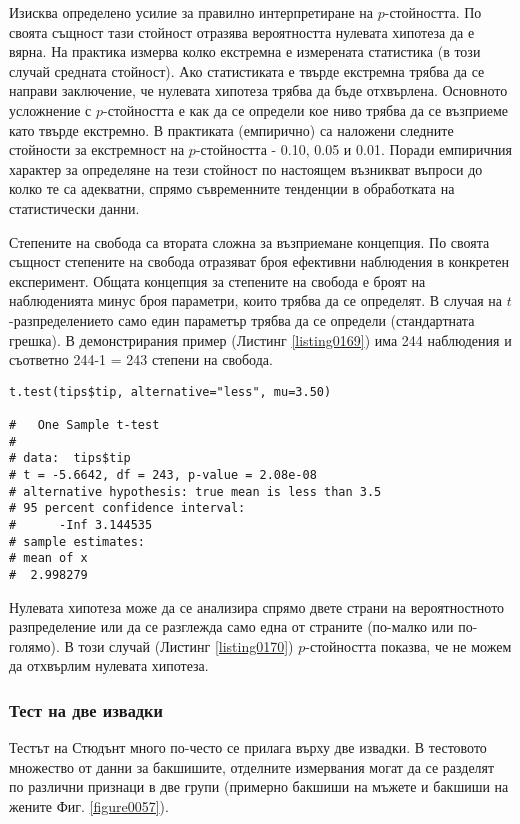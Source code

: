 Изисква определено усилие за правилно интерпретиране на $p$-стойността. По своята същност тази стойност отразява вероятността нулевата хипотеза да е вярна. На практика измерва колко екстремна е измерената статистика (в този случай средната стойност). Ако статистиката е твърде екстремна трябва да се направи заключение, че нулевата хипотеза трябва да бъде отхвърлена. Основното усложнение с $p$-стойността е как да се определи кое ниво трябва да се възприеме като твърде екстремно. В практиката (емпирично) са наложени следните стойности за екстремност на $p$-стойността - 0.10, 0.05 и 0.01. Поради емпиричния характер за определяне на тези стойност по настоящем възникват въпроси до колко те са адекватни, спрямо съвременните тенденции в обработката на статистически данни. 

Степените на свобода са втората сложна за възприемане концепция. По своята същност степените на свобода отразяват броя ефективни наблюдения в конкретен експеримент. Общата концепция за степените на свобода е броят на наблюденията минус броя параметри, които трябва да се определят. В случая на $t$-разпределението само един параметър трябва да се определи (стандартната грешка). В демонстрирания пример (Листинг \ref{listing0169}) има 244 наблюдения и съответно 244-1 = 243 степени на свобода. 

\begin{lstlisting}[caption=Едностранна t-статистика, label=listing0170]
t.test(tips$tip, alternative="less", mu=3.50)

# 	One Sample t-test
# 
# data:  tips$tip
# t = -5.6642, df = 243, p-value = 2.08e-08
# alternative hypothesis: true mean is less than 3.5
# 95 percent confidence interval:
#      -Inf 3.144535
# sample estimates:
# mean of x 
#  2.998279 
\end{lstlisting}

Нулевата хипотеза може да се анализира спрямо двете страни на вероятностното разпределение или да се разглежда само една от страните (по-малко или по-голямо). В този случай (Листинг \ref{listing0170}) $p$-стойността показва, че не можем да отхвърлим нулевата хипотеза. 

\subsubsection{Тест на две извадки}

Тестът на Стюдънт много по-често се прилага върху две извадки. В тестовото множество от данни за бакшишите, отделните измервания могат да се разделят по различни признаци в две групи (примерно бакшиши на мъжете и бакшиши на жените Фиг. \ref{figure0057}).

